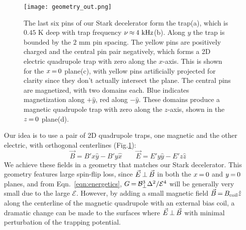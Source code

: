 \documentclass[%
 reprint,
 amsmath,amssymb,
 aps,
prl,
]{revtex4-1}
\newcommand{\epb}{{$\vec{E}\s {\perp}\s\vec{B}$}}
\newcommand{\s}{{\nobreak\hspace{.2em}}}
\begin{document}



\begin{figure}[tb]
\texttt{[image: geometry\_out.png]}%
\caption{
The last six pins of our Stark decelerator\s\cite{Sawyer2008} form the trap\s(a), which is $0.45\text{ K}$ deep with trap frequency $\nu\s {\approx}\s 4\text{ kHz}$\s(b). 
Along $y$ the trap is bounded by the $2\text{ mm}$ pin spacing. 
The yellow pins are positively charged and the central pin pair negatively, which forms a 2D electric quadrupole trap with zero along the $x$-axis. 
This is shown for the $x\s {=}\s 0$ plane\s(c), with yellow pins artificially projected for clarity since they don't actually intersect the plane. 
The central pins are magnetized, with two domains each. 
Blue indicates magnetization along $+\hat{y}$, red along $-\hat{y}$. 
These domains produce a magnetic quadrupole trap with zero along the $z$-axis, shown in the $z\s {=}\s 0$ plane\s(d). 
\label{fig:CAD}}
\end{figure}

Our idea is to use a pair of 2D quadrupole traps, one magnetic and the other electric, with orthogonal centerlines (Fig.\s\ref{fig:CAD}):
\begin{equation}
\label{eqn:BE}
\vec{B}=B'x\hat{y}-B'y\hat{x}\quad\quad\vec{E}=E'y\hat{y}-E'z\hat{z}
\end{equation}
We achieve these fields in a geometry that matches our Stark decelerator\s\cite{Bochinski2003}. 
This geometry features large spin-flip loss, since \epb{} in both the $x\s {=}\s 0$ and $y\s {=}\s 0$ planes, and from Eqn.~\ref{eqn:energetics}, $G\s {=} \s \mathcal{B}_\perp^3\Delta^2/\mathcal{E}^4$ will be generally very small due to the large $\mathcal{E}$.
However, by adding a small magnetic field $\vec{B}\s {=}\s B_\text{coil}\hat{z}$ along the centerline of the magnetic quadrupole with an external bias coil, a dramatic change can be made to the surfaces where \epb{} with minimal perturbation of the trapping potential.
\end{document}
